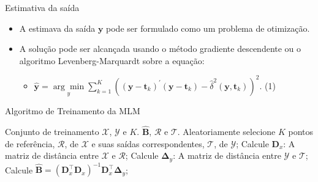 \documentclass{beamer}
\begin{document}

\begin{frame}{Estimativa da saída}

	\begin{itemize}
	    \item A estimava da saída $\mathbf{y}$ pode ser formulado como um problema de otimização.
	    \item A solução pode ser alcançada usando o método gradiente descendente ou o algoritmo Levenberg-Marquardt sobre a equação:
	    	\begin{itemize}
	    		\item $\mathbf{ \widehat{y} }= \underset{y}{\arg\min}\sum_{k=1}^{K}((\mathbf{y} - \mathbf{t}_k)^{'}(\mathbf{y} - \mathbf{t}_k) - \widehat{\delta}^{2}(\mathbf{y}, \mathbf{t}_k))^{2}.$ (1)
	    	\end{itemize}
	 \end{itemize}

\end{frame}



\begin{frame}{Algoritmo de Treinamento da MLM}

	\begin{algorithm}[H]
	\caption{Algoritmo de Treinamento da MLM}
	\begin{algorithmic}[1]
	\REQUIRE Conjunto de treinamento $\mathcal{X}$, $\mathcal{Y}$ e $K$.%
	\ENSURE $ \mathbf{ \widehat{B} }$, $ \mathcal{R} $ e $ \mathcal{T} $.%
	\STATE Aleatoriamente selecione $K$ pontos de referência, $\mathcal{R}$, de $\mathcal{X}$ e suas saídas correspondentes, $\mathcal{T}$, de $\mathcal{Y}$;%
	\STATE Calcule $\mathbf{D}_x$: A matriz de distância entre $\mathcal{X}$ e $\mathcal{R}$;%
	\STATE Calcule $\boldsymbol{\Delta}_y$: A matriz de distância entre $\mathcal{Y}$ e $ \mathcal{T}$;%
	\STATE Calcule $\mathbf{\widehat{B}} = (\mathbf{D}_x^{\intercal}\mathbf{D}_x)^{-1}\mathbf{D}^{\intercal}_x\boldsymbol{\Delta}_y $;%
	\end{algorithmic}
	\end{algorithm}

\end{frame}
\end{document}
